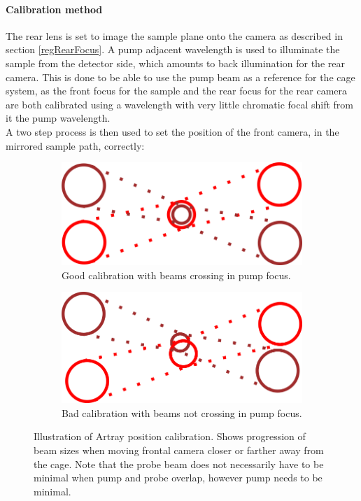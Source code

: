 \documentclass[twoside,openright]{scrreprt}
\begin{document}
\paragraph{Calibration method}
The rear lens is set to image the sample plane onto the camera as described in section \ref{regRearFocus}. A pump adjacent wavelength is used to illuminate the sample from the detector side, which amounts to back illumination for the rear camera. This is done to be able to use the pump beam as a reference for the cage system, as the front focus for the sample and the rear focus for the rear camera are both calibrated using a wavelength with very little chromatic focal shift from it the pump wavelength.\\
A two step process is then used to set the position of the front camera, in the mirrored sample path, correctly:
\begin{figure}[hbtp]
\centering
\begin{subfigure}[b]{0.5\linewidth}
\centering
\includegraphics[scale=1]{images/ArtrayCalibrationIllustration_Good.png}
\caption{Good calibration with beams crossing in pump focus.}
\end{subfigure}\hfill
\begin{subfigure}[b]{0.5\linewidth}
\centering
\includegraphics[scale=1]{images/ArtrayCalibrationIllustration_Bad.png}
\caption{Bad calibration with beams not crossing in pump focus.}
\end{subfigure}
\caption{Illustration of Artray position calibration. Shows progression of beam sizes when moving frontal camera closer or farther away from the cage. Note that the probe beam does not necessarily have to be minimal when pump and probe overlap, however pump needs to be minimal.\label{fig:calibrationArtrayIllustration}}
\end{figure}
\end{document}

